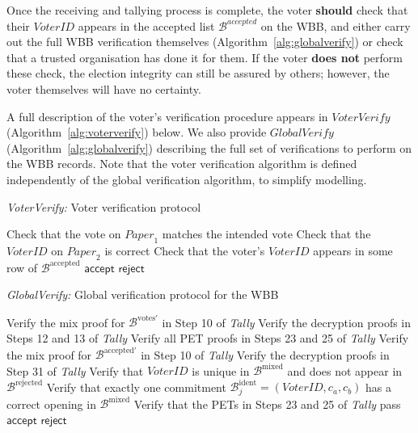 \documentclass[12pt,a4paper]{article}
\theoremstyle{definition}
\newcommand{\Vote}{\mathit{Vote}}
\newcommand{\VoterID}{\mathit{VoterID}}
\newcommand{\Paper}{\mathit{Paper}}
\begin{document}
Once the receiving and tallying process is complete, the voter \textbf{should} check that their $\VoterID$ appears in the accepted list $\mathcal{B}^{accepted}$ on the WBB, and either carry out the full WBB verification themselves (Algorithm~\ref{alg:globalverify}) or check that a trusted organisation has done it for them. If the voter \textbf{does not} perform these check, the election integrity can still be assured by others; however, the voter themselves will have no certainty.

A full description of the voter's verification procedure appears in $\textit{VoterVerify}$ (Algorithm~\ref{alg:voterverify}) below. We also provide $\textit{GlobalVerify}$ (Algorithm~\ref{alg:globalverify}) describing the full set of verifications to perform on the WBB records. Note that the voter verification algorithm is defined independently of the global verification algorithm, to simplify modelling.

\singlespacing
\begin{algorithm}
    \caption{\textit{VoterVerify:} Voter verification protocol}
	\begin{algorithmic}[1]
        \State Check that the vote on $\Paper_1$ matches the intended vote
        \State Check that the $\VoterID$ on $\Paper_2$ is correct
        \State Check that the voter's $\VoterID$ appears in some row of $\mathcal{B}^{\text{accepted}}$
            \State \Return $\mathsf{accept}$
        \Else
            \State \Return $\mathsf{reject}$
        \EndIf
    \end{algorithmic}
	\label{alg:voterverify}
\end{algorithm}
\begin{algorithm}
    \caption{\textit{GlobalVerify:} Global verification protocol for the WBB}
	\begin{algorithmic}[1]
        \State Verify the mix proof for $\mathcal{B}^{\text{votes}'}$ in Step 10 of \textit{Tally}
        \State Verify the decryption proofs in Steps 12 and 13 of \textit{Tally}
        \State Verify all PET proofs in Steps 23 and 25 of \textit{Tally}
        \State Verify the mix proof for $\mathcal{B}^{\text{accepted}'}$ in Step 10 of \textit{Tally}
        \State Verify the decryption proofs in Step 31 of \textit{Tally}
        \For {each row $\mathcal{B}^{\text{accepted}}_i = (\VoterID, \{g^{\Vote}\}_{pk})$}
            \State Verify that $\VoterID$ is unique in $\mathcal{B}^{\text{mixed}}
            $ and does not appear in $\mathcal{B}^{\text{rejected}}$
            \State Verify that exactly one commitment $\mathcal{B}^{\text{ident}}_j=(\VoterID, c_a, c_b)$ has a correct opening in $\mathcal{B}^{\text{mixed}}$
            \State Verify that the PETs in Steps 23 and 25 of \textit{Tally} pass
        \EndFor
            \State \Return $\mathsf{accept}$
        \Else
            \State \Return $\mathsf{reject}$
        \EndIf
    \end{algorithmic}
	\label{alg:globalverify}
\end{algorithm}
\onehalfspacing
\end{document}
